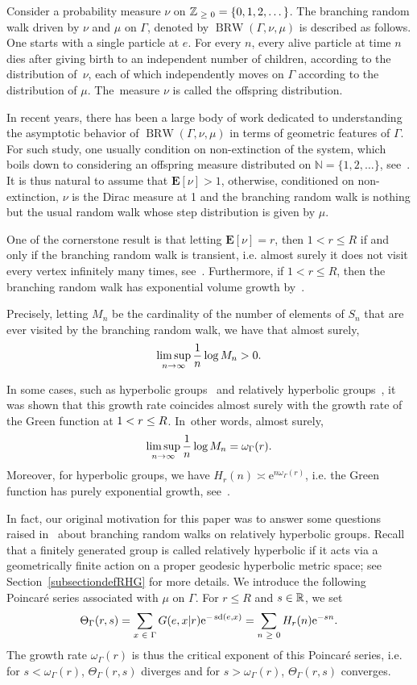 \documentclass[AHL,Unicode,longabstracts]{cedram}
\newcommand{\N}{\mathbb{N}}
\newcommand{\Z}{\mathbb{Z}}
\newcommand{\R}{\mathbb{R}}
\newcommand{\rme}{\mathrm{e}}
\newcommand{\bfE}{\mathbf{E}}
\DeclareMathOperator{\BRW}{BRW}
\DeclareMathOperator{\sd}{sd}
\let\oldin\in
\renewcommand{\in}{\mathchoice{\oldin}{\oldin}{\,\oldin\,}{\,\oldin\,}}
\let\oldge\ge
\renewcommand{\ge}{\mathchoice{\oldge}{\oldge}{\,\oldge\,}{\,\oldge\,}}
\let\oldle\le
\renewcommand{\le}{\mathchoice{\oldle}{\oldle}{\,\oldle\,}{\,\oldle\,}}
\renewcommand*{\to}{\mathchoice{\longrightarrow}{\rightarrow}{\rightarrow}{\rightarrow}}
\begin{document}
Consider a probability measure $\nu$ on $\Z_{\ge 0}=\{0,1,2,\dots\}$. The branching random walk driven by $\nu$ and $\mu$ on $\Gamma$, denoted by $\BRW(\Gamma,\nu,\mu)$ is described as follows. One starts with a single particle at $e$. For every $n$, every alive particle at time $n$ dies after giving birth to an independent number of children, according to the distribution of~$\nu$, each of which independently moves on $\Gamma$ according to the distribution of $\mu$. The~measure $\nu$ is called the offspring distribution.

In recent years, there has been a large body of work dedicated to understanding the asymptotic behavior of $\BRW(\Gamma,\nu,\mu)$ in terms of geometric features of $\Gamma$. For such study, one usually condition on non-extinction of the system, which boils down to considering an offspring measure distributed on $\N=\{1,2,\dots\}$, see~\cite[Chapter~1]{AN04}. It is thus natural to assume that $\bfE[\nu]>1$, otherwise, conditioned on non-extinction, $\nu$ is the Dirac measure at 1 and the branching random walk is nothing but the usual random walk whose step distribution is given by $\mu$.

One of the cornerstone result is that letting $\bfE[\nu]=r$, then $1<r\leq R$ if and only if the branching random walk is transient, i.e. almost surely it does not visit every vertex infinitely many times, see~\cite{BP94,GM06}. Furthermore, if $1<r\leq R$, then the branching random walk has exponential volume growth by~\cite{BM12}.

Precisely, letting $M_n$ be the cardinality of the number of elements of $S_n$ that are ever visited by the branching random walk, we have that almost surely,
\[
\limsup_{n\to\infty} \frac{1}{n}\log M_n>0.
\]


In some cases, such as hyperbolic groups~\cite[Theorem~1.1]{SWX} and relatively hyperbolic groups~\cite[Theorem~1.1]{DWY}, it was shown that this growth rate coincides almost surely with the growth rate of the Green function at $1<r\le R$. In~other words, almost surely,
\[
\limsup_{n\to\infty} \frac{1}{n}\log M_n=\omega_\Gamma(r).
\]
Moreover, for hyperbolic groups, we have $H_r(n)\asymp \rme^{n\omega_\Gamma(r)}$, i.e. the Green function has purely exponential growth, see~\cite[Theorem~3.1]{SWX}.



In fact, our original motivation for this paper was to answer some questions raised in~\cite{DWY} about branching random walks on relatively hyperbolic groups. Recall that a finitely generated group is called relatively hyperbolic if it acts via a geometrically finite action on a proper geodesic hyperbolic metric space; see Section~\ref{subsectiondefRHG} for more details. We introduce the following Poincaré series associated with $\mu$ on $\Gamma$. For $r\leq R$ and $s\in \R$, we set
\begin{align}\label{PoincareSeriesEQ}
\Theta_\Gamma(r,s)=\sum_{x\in \Gamma}G(e,x|r)\rme^{-\sd(e,x)}=\sum_{n\ge 0}H_r(n)\rme^{-sn}.
\end{align}
The growth rate $\omega_\Gamma(r)$ is thus the critical exponent of this Poincaré series, i.e. for $s<\omega_\Gamma(r)$, $\Theta_\Gamma(r,s)$ diverges and for $s>\omega_\Gamma(r)$, $\Theta_\Gamma(r,s)$ converges.
\end{document}
